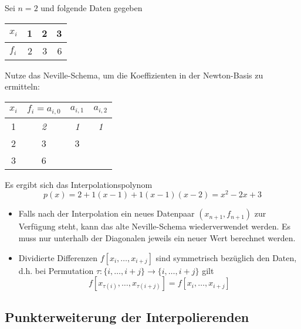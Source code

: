 \documentclass[
]{mycourse}
\begin{document}
\begin{ex*}
	Sei $n=2$ und folgende Daten gegeben
	\begin{table}[H]
		\centering
		\begin{tabular}{l|rrr}
			$x_i$ & 1 & 2 & 3  \\ \hline
			$f_i$ & 2 & 3 & 6 
		\end{tabular}
	\end{table}
	Nutze das Neville-Schema, um die Koeffizienten in der Newton-Basis zu ermitteln:
	\begin{table}[H]
		\centering
		\begin{tabular}{c|ccc}
			$x_i$ & $f_i=a_{i,0}$ & $a_{i,1}$ & $a_{i,2}$ \\ \hline
			1 & \emph{2} & \emph{1} & \emph{1} \\
			2 & 3 & 3 & \\
			3 & 6 & &
		\end{tabular}
	\end{table}
	Es ergibt sich das Interpolationspolynom
	\[
		p(x) = 2+ 1(x-1) + 1(x-1)(x-2) = x^2 -2x+3
	\]
\end{ex*}

\begin{note}
	\begin{itemize}
		\item Falls nach der Interpolation ein neues Datenpaar $(x_{n+1},f_{n+1})$ zur Verfügung steht, kann das alte Neville-Schema wiederverwendet werden.
			Es muss nur unterhalb der Diagonalen jeweils ein neuer Wert berechnet werden.
		\item
			Dividierte Differenzen $f[x_i,\dotsc,x_{i+j}]$ sind symmetrisch bezüglich den Daten, d.h. bei Permutation $\tau: \{i,\dotsc,i+j\} \to \{i,\dotsc,i+j\}$ gilt
			\[
				f[x_{\tau(i)},\dotsc,x_{\tau(i+j)}] = f[x_i,\dotsc,x_{i+j}]
			\]
	\end{itemize}
\end{note}

\subsection{Punkterweiterung der Interpolierenden}
\end{document}
